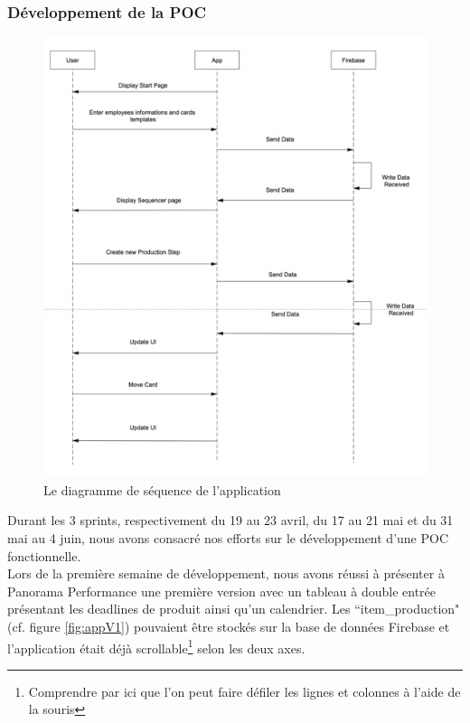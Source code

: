 \subsubsection*{Développement de la POC}

\begin{figure}[!h]
    \centering
    \includegraphics[scale=1]{img/sequence.jpeg}
    \caption{Le diagramme de séquence de l'application}
    \label{fig:POC}
\end{figure}


Durant les 3 sprints, respectivement du 19 au 23 avril, du 17 au 21 mai et du 31 mai au 4 juin, nous avons consacré nos efforts sur le développement d'une POC fonctionnelle.\\

Lors de la première semaine de développement, nous avons réussi à présenter à Panorama Performance une première version avec un tableau à double entrée présentant les deadlines de produit ainsi qu'un calendrier. Les “item\_production" (cf. figure \ref{fig:appV1}) pouvaient être stockés sur la base de données Firebase et l'application était déjà scrollable\footnote{Comprendre par ici que l'on peut faire défiler les lignes et colonnes à l'aide de la souris} selon les deux axes.\\


